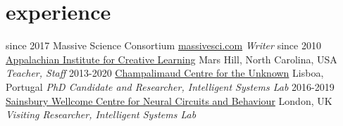 \documentclass[]{friggeri-cv}
\begin{document}
\section{experience}

\begin{entrylist}
  \entry
    {since 2017}
    {Massive Science Consortium}
    {\href{massivesci.com}{massivesci.com}}
    {\emph{Writer}}
  \entry
    {since 2010}
    {\href{http://www.appalachianinstitute.org/}{Appalachian Institute for Creative Learning}}
    {Mars Hill, North Carolina, USA}
    {\emph{Teacher, Staff}}
  \entry
    {2013-2020}
    {\href{http://neuro.fchampalimaud.org/en/research/investigators/research-groups/group/Kampff/}{Champalimaud Centre for the Unknown}}
    {Lisboa, Portugal}
    {\emph{PhD Candidate and Researcher, Intelligent Systems Lab}}
  \entry
    {2016-2019}
    {\href{https://www.ucl.ac.uk/swc/}{Sainsbury Wellcome Centre for Neural Circuits and Behaviour}}
    {London, UK}
    {\emph{Visiting Researcher, Intelligent Systems Lab}}
\end{entrylist}

\newpage
\end{document}

